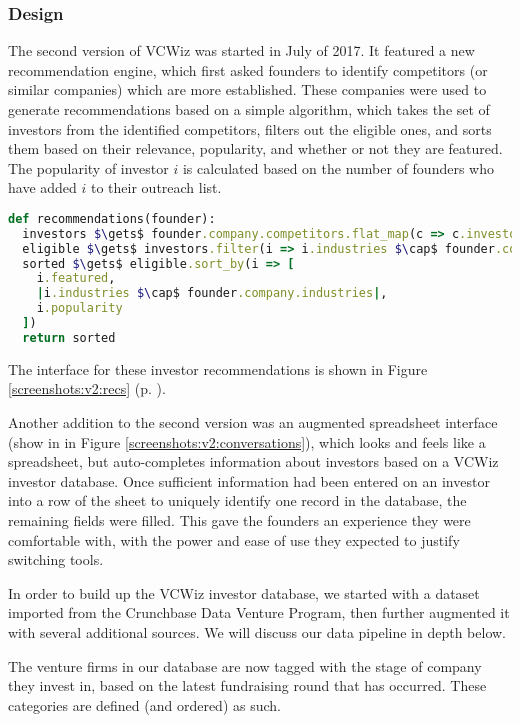 \subsubsection{Design}

The second version of VCWiz was started in July of 2017. It featured a new recommendation engine, which first asked founders to identify competitors (or similar companies) which are more established. These companies were used to generate recommendations based on a simple algorithm, which takes the set of investors from the identified competitors, filters out the eligible ones, and sorts them based on their relevance, popularity, and whether or not they are featured. The popularity of investor $i$ is calculated based on the number of founders who have added $i$ to their outreach list.

\begin{lstlisting}[frame=single,mathescape=true,language=Ruby,basicstyle=\footnotesize,columns=fullflexible]
def recommendations(founder):
  investors $\gets$ founder.company.competitors.flat_map(c => c.investors)
  eligible $\gets$ investors.filter(i => i.industries $\cap$ founder.company.industries $\neq$ $\emptyset$)
  sorted $\gets$ eligible.sort_by(i => [
    i.featured,
    |i.industries $\cap$ founder.company.industries|,
    i.popularity
  ])
  return sorted
\end{lstlisting}

The interface for these investor recommendations is shown in Figure \ref{screenshots:v2:recs} (p. \pageref{screenshots:v2:recs}).

Another addition to the second version was an augmented spreadsheet interface (show in in Figure \ref{screenshots:v2:conversations}), which looks and feels like a spreadsheet, but auto-completes information about investors based on a VCWiz investor database. Once sufficient information had been entered on an investor into a row of the sheet to uniquely identify one record in the database, the remaining fields were filled. This gave the founders an experience they were comfortable with, with the power and ease of use they expected to justify switching tools.

In order to build up the VCWiz investor database, we started with a dataset imported from the Crunchbase Data Venture Program, then further augmented it with several additional sources. We will discuss our data pipeline in depth below.

The venture firms in our database are now tagged with the stage of company they invest in, based on the latest fundraising round that has occurred. These categories are defined (and ordered) as such.

